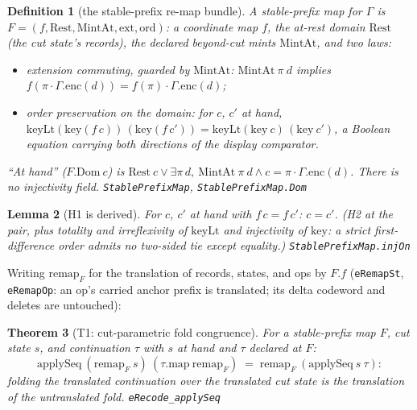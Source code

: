 \documentclass[11pt]{article}
\newtheorem{theorem}{Theorem}[section]
\newtheorem{lemma}[theorem]{Lemma}
\newtheorem{definition}[theorem]{Definition}
\newcommand{\lean}[1]{\texttt{#1}}
\begin{document}
\begin{definition}[the stable-prefix re-map bundle]
\label{def:spm}
A \emph{stable-prefix map} for $\Gamma$ is $F = (f, \mathrm{Rest},
\mathrm{MintAt}, \mathrm{ext}, \mathrm{ord})$: a coordinate map $f$,
the at-rest domain $\mathrm{Rest}$ (the cut state's records), the
declared beyond-cut mints $\mathrm{MintAt}$, and two laws:
\begin{itemize}[leftmargin=2em]
\item[(H3)] \emph{extension commuting, guarded by} $\mathrm{MintAt}$:
  $\mathrm{MintAt}\ \pi\ d$ implies $f(\pi \cdot
  \Gamma.\mathrm{enc}(d)) = f(\pi) \cdot \Gamma.\mathrm{enc}(d)$;
\item[(H2)] \emph{order preservation on the domain}: for $c$, $c'$ at
  hand, $\mathrm{keyLt}(\mathrm{key}(f\,c))\,(\mathrm{key}(f\,c')) =
  \mathrm{keyLt}(\mathrm{key}\ c)\,(\mathrm{key}\ c')$, a Boolean
  equation carrying both directions of the display comparator.
\end{itemize}
``At hand'' ($F.\mathrm{Dom}\ c$) is $\mathrm{Rest}\ c \vee \exists
\pi\, d,\ \mathrm{MintAt}\ \pi\ d \wedge c = \pi \cdot
\Gamma.\mathrm{enc}(d)$. There is no injectivity field.
\hfill\lean{StablePrefixMap}, \lean{StablePrefixMap.Dom}
\end{definition}

\begin{lemma}[H1 is derived]
\label{lem:spmh1}
For $c$, $c'$ at hand with $f\,c = f\,c'$: $c = c'$. (H2 at the pair,
plus totality and irreflexivity of $\mathrm{keyLt}$ and injectivity of
$\mathrm{key}$: a strict first-difference order admits no two-sided
tie except equality.)
\hfill\lean{StablePrefixMap.injOn}
\end{lemma}

\noindent Writing $\mathrm{remap}_F$ for the translation of records,
states, and ops by $F.f$ (\lean{eRemapSt}, \lean{eRemapOp}: an op's
carried anchor prefix is translated; its delta codeword and deletes
are untouched):

\begin{theorem}[T1: cut-parametric fold congruence]
\label{thm:recode1}
For a stable-prefix map $F$, cut state $s$, and continuation $\tau$
with $s$ at hand and $\tau$ declared at $F$:
\[
  \mathrm{applySeq}\ (\mathrm{remap}_F\ s)\
  (\tau.\mathrm{map}\ \mathrm{remap}_F)
  \;=\; \mathrm{remap}_F\ (\mathrm{applySeq}\ s\ \tau) :
\]
folding the translated continuation over the translated cut state is
the translation of the untranslated fold.
\hfill\lean{eRecode\_applySeq}
\end{theorem}
\end{document}

